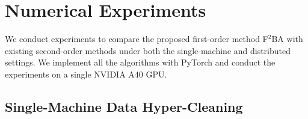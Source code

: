 \documentclass{article}
\begin{document}

 
\section{Numerical Experiments}

We conduct experiments to compare the proposed first-order method F${}^2$BA with existing second-order methods under both the single-machine and distributed settings.
We implement all the algorithms with PyTorch and conduct the experiments on a single NVIDIA A40 GPU.

\subsection{Single-Machine Data Hyper-Cleaning}
\end{document}
